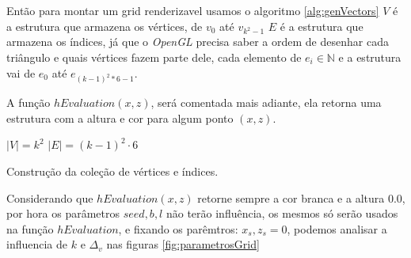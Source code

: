 Então para montar um grid renderizavel usamos o algoritmo \ref{alg:genVectors}
$V$ é a estrutura que armazena os vértices, de $v_{0}$ até $v_{k^2-1}$ 
$E$ é a estrutura que armazena os índices, já que o \textit{OpenGL} precisa
saber a ordem de desenhar cada triângulo e quais vértices fazem parte dele, 
cada elemento de $e_{i} \in \mathbb{N}$ e a estrutura vai de $e_{0}$ até $e_{(k-1)^2 * 6 - 1}$.

A função \textit{$hEvaluation(x, z)$}, será comentada mais adiante, ela retorna uma estrutura
com a altura e cor para algum ponto $(x, z)$.
 
\begin{algorithm}[H]\label{alg:genVectors}
    $|V| = k^2$\;
    $|E| = (k-1)^2 \cdot 6$\;
    \caption{Construção da coleção de vértices e índices.}
\end{algorithm}

Considerando que \textit{$hEvaluation(x, z)$} retorne sempre a cor branca
e a altura $0.0$, por hora os parâmetros $seed, b, l$ não terão influência, os mesmos 
só serão usados na função \textit{$hEvaluation$}, e fixando os parêmtros: $x_{s}, z_{s} = 0$, 
podemos analisar a influencia de $k$ e $\Delta_{v}$ nas figuras \ref{fig:parametrosGrid}

